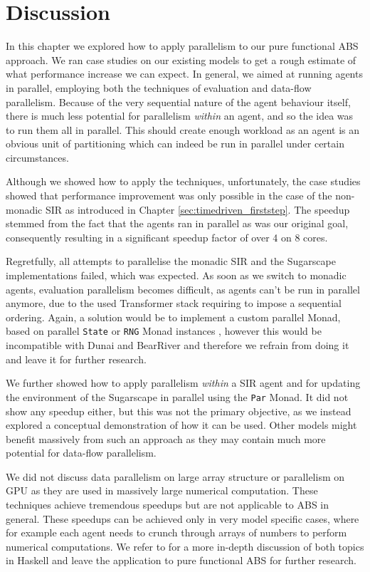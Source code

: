 \section{Discussion}
In this chapter we explored how to apply parallelism to our pure functional ABS approach. We ran case studies on our existing models to get a rough estimate of what performance increase we can expect. In general, we aimed at running agents in parallel, employing both the techniques of evaluation and data-flow parallelism. Because of the very sequential nature of the agent behaviour itself, there is much less potential for parallelism \textit{within} an agent, and so the idea was to run them all in parallel. This should create enough workload as an agent is an obvious unit of partitioning which can indeed be run in parallel under certain circumstances.

Although we showed how to apply the techniques, unfortunately, the case studies showed that performance improvement was only possible in the case of the non-monadic SIR as introduced in Chapter \ref{sec:timedriven_firststep}. The speedup stemmed from the fact that the agents ran in parallel as was our original goal, consequently resulting in a significant speedup factor of over 4 on 8 cores. 

Regretfully, all attempts to parallelise the monadic SIR and the Sugarscape implementations failed, which was expected. As soon as we switch to monadic agents, evaluation parallelism becomes difficult, as agents can't be run in parallel anymore, due to the used Transformer stack requiring to impose a sequential ordering. Again, a  solution would be to implement a custom parallel Monad, based on parallel \texttt{State} or \texttt{RNG} Monad instances \cite{par_extras_hackage}, however this would be incompatible with Dunai and BearRiver and therefore we refrain from doing it and leave it for further research.

We further showed how to apply parallelism \textit{within} a SIR agent and for updating the environment of the Sugarscape in parallel using the \texttt{Par} Monad. It did not show any speedup either, but this was not the primary objective, as we instead explored a conceptual demonstration of how it can be used. Other models might benefit massively from such an approach as they may contain much more potential for data-flow parallelism.

We did not discuss data parallelism on large array structure or parallelism on GPU as they are used in massively large numerical computation. These techniques achieve tremendous speedups but are not applicable to ABS in general. These speedups can be achieved only in very model specific cases, where for example each agent needs to crunch through arrays of numbers to perform numerical computations. We refer to \cite{marlow_parallel_2013} for a more in-depth discussion of both topics in Haskell and leave the application to pure functional ABS for further research.

